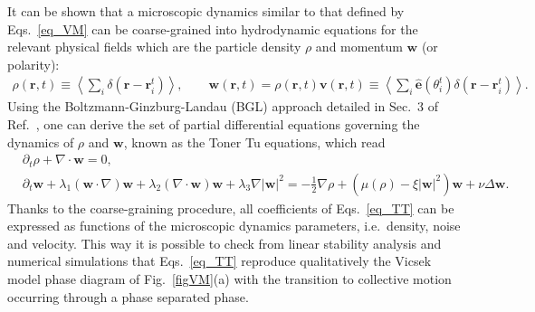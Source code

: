 It can be shown that a microscopic dynamics similar to that defined by Eqs.~\eqref{eq_VM} can be coarse-grained into hydrodynamic equations for the relevant physical fields which are the particle density $\rho$ and momentum $\bm w$ (or polarity):
\begin{align*}
\rho(\bm r,t) \equiv \left\langle \sum_i \delta(\bm r - \bm r_i^t) \right\rangle , \qquad 
\bm w(\bm r,t) = \rho(\bm r,t) \bm v(\bm r,t) \equiv \left\langle \sum_i \hat{\bm e}(\theta_i^t)\delta(\bm r - \bm r_i^t) \right\rangle .
\end{align*}
Using the Boltzmann-Ginzburg-Landau (BGL) approach detailed in Sec.~3 of Ref.~\cite{DADAM_LesHouches}, 
one can derive the set of partial differential equations governing the dynamics of $\rho$ and $\bm w$, known as the Toner Tu equations, which read
\begin{subequations}
\label{eq_TT}
\begin{align}
\label{eq_TT_rho}
& \partial_t \rho + \nabla \cdot \bm w = 0 , \\
\label{eq_TT_w}
& \partial_t \bm w + \lambda_1 (\bm w \cdot \nabla)\bm w + \lambda_2 (\nabla \cdot \bm w) \bm w + \lambda_3 \nabla |\bm w|^2 = 
-\frac{1}{2}\nabla \rho + \left( \mu(\rho) - \xi |\bm w|^2 \right) \bm w + \nu \Delta \bm w .
\end{align}
\end{subequations}
Thanks to the coarse-graining procedure, all coefficients of Eqs.~\eqref{eq_TT} can be expressed as functions of the microscopic dynamics parameters, i.e.\ density, noise and velocity.
This way it is possible to check from linear stability analysis and numerical simulations that Eqs.~\eqref{eq_TT} reproduce qualitatively the 
Vicsek model phase diagram of Fig.~\ref{figVM}(a) with the transition to collective motion occurring through a phase separated phase.
 
